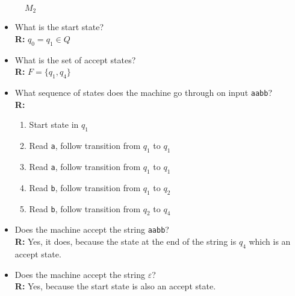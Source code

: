 \documentclass{article}
\begin{document}
\begin{figure}[h!]
\centering
\caption{$M_2$}
\end{figure}

\begin{itemize}

\item What is the start state? \\
\textbf{R: } $q_0 = q_1 \in Q$

\item What is the set of accept states? \\
\textbf{R: } $F = \{q_1, q_4\}$

\item What sequence of states does the machine go through on input
\texttt{aabb}? \\
\textbf{R: }
\begin{enumerate}
    \item Start state in $q_1$
    \item Read \texttt{a}, follow transition from $q_1$ to $q_1$
    \item Read \texttt{a}, follow transition from $q_1$ to $q_1$
    \item Read \texttt{b}, follow transition from $q_1$ to $q_2$
    \item Read \texttt{b}, follow transition from $q_2$ to $q_4$
\end{enumerate}

\item Does the machine accept the string \texttt{aabb}? \\
\textbf{R: } Yes, it does, because the state at the end of the string is $q_4$
which is an accept state.

\item Does the machine accept the string $\varepsilon$? \\
\textbf{R: } Yes, because the start state is also an accept state.

\end{itemize}
\end{document}
